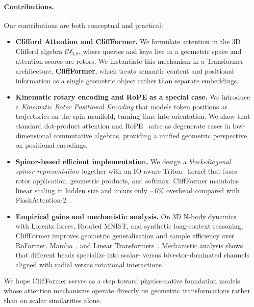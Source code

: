 \documentclass{article}
\theoremstyle{plain}
\theoremstyle{definition}
\theoremstyle{remark}
\newcommand{\cliff}{\mathcal{Cl}}
\begin{document}
\paragraph{Contributions.}
Our contributions are both conceptual and practical:

\begin{itemize}
    \item \textbf{Clifford Attention and CliffFormer.} We formulate attention in the 3D Clifford algebra $\cliff_{3,0}$, where queries and keys live in a geometric space and attention scores are rotors. We instantiate this mechanism in a Transformer architecture, \textbf{CliffFormer}, which treats semantic content and positional information as a single geometric object rather than separate embeddings.
    \item \textbf{Kinematic rotary encoding and RoPE as a special case.} We introduce a \emph{Kinematic Rotor Positional Encoding} that models token positions as trajectories on the spin manifold, turning time into orientation. We show that standard dot-product attention and RoPE~\cite{su2024roformer} arise as degenerate cases in low-dimensional commutative algebras, providing a unified geometric perspective on positional encodings.
    \item \textbf{Spinor-based efficient implementation.} We design a \emph{block-diagonal spinor representation} together with an IO-aware Triton~\cite{tillet2019triton} kernel that fuses rotor application, geometric products, and softmax. CliffFormer maintains linear scaling in hidden size and incurs only $\sim 6\%$ overhead compared with FlashAttention-2~\cite{dao2024flashattention2}.
    \item \textbf{Empirical gains and mechanistic analysis.} On 3D N-body dynamics with Lorentz forces, Rotated MNIST, and synthetic long-context reasoning, CliffFormer improves geometric generalization and sample efficiency over RoFormer, Mamba~\cite{gu2024mamba}, and Linear Transformers~\cite{katharopoulos2020transformers}. Mechanistic analysis shows that different heads specialize into scalar- versus bivector-dominated channels aligned with radial versus rotational interactions.
\end{itemize}

We hope CliffFormer serves as a step toward physics-native foundation models whose attention mechanisms operate directly on geometric transformations rather than on scalar similarities alone.



\end{document}
